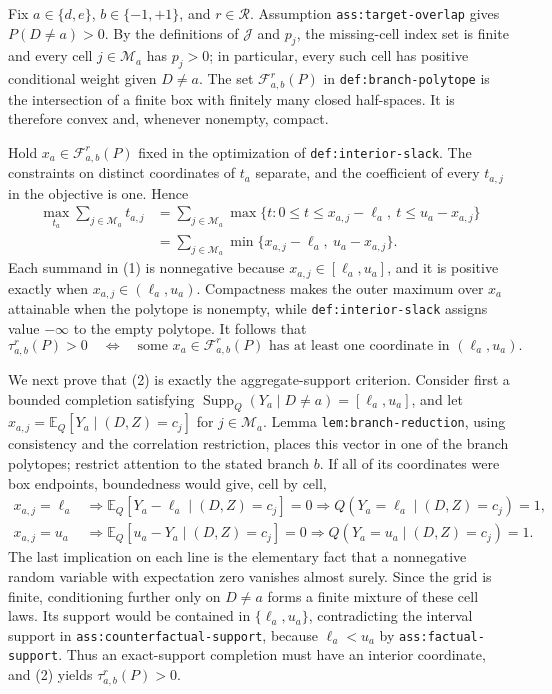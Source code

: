 Fix \(a\in\{d,e\}\), \(b\in\{-1,+1\}\), and \(r\in\mathcal R\).  Assumption \texttt{ass:target-overlap} gives \(P(D\ne a)>0\).  By the definitions of \(\mathcal J\) and \(p_j\), the missing-cell index set is finite and every cell \(j\in\mathcal M_a\) has \(p_j>0\); in particular, every such cell has positive conditional weight given \(D\ne a\).  The set \(\mathcal F_{a,b}^r(P)\) in \texttt{def:branch-polytope} is the intersection of a finite box with finitely many closed half-spaces.  It is therefore convex and, whenever nonempty, compact.

Hold \(x_a\in\mathcal F_{a,b}^r(P)\) fixed in the optimization of \texttt{def:interior-slack}.  The constraints on distinct coordinates of \(t_a\) separate, and the coefficient of every \(t_{a,j}\) in the objective is one.  Hence
\[
\begin{aligned}
\max_{t_a}\sum_{j\in\mathcal M_a}t_{a,j}
&=\sum_{j\in\mathcal M_a}
  \max\{t:0\le t\le x_{a,j}-\ell_a,\ t\le u_a-x_{a,j}\} \\
&=\sum_{j\in\mathcal M_a}
  \min\{x_{a,j}-\ell_a,\ u_a-x_{a,j}\}.
\end{aligned}
\tag{1}
\]
Each summand in (1) is nonnegative because \(x_{a,j}\in[\ell_a,u_a]\), and it is positive exactly when \(x_{a,j}\in(\ell_a,u_a)\).  Compactness makes the outer maximum over \(x_a\) attainable when the polytope is nonempty, while \texttt{def:interior-slack} assigns value \(-\infty\) to the empty polytope.  It follows that
\[
\tau_{a,b}^r(P)>0
\quad\Longleftrightarrow\quad
\text{some }x_a\in\mathcal F_{a,b}^r(P)
\text{ has at least one coordinate in }(\ell_a,u_a).
\tag{2}
\]

We next prove that (2) is exactly the aggregate-support criterion.  Consider first a bounded completion satisfying
\(\operatorname{Supp}_Q(Y_a\mid D\ne a)=[\ell_a,u_a]\), and let
\(x_{a,j}=\mathbb E_Q[Y_a\mid(D,Z)=c_j]\) for \(j\in\mathcal M_a\).  Lemma \texttt{lem:branch-reduction}, using consistency and the correlation restriction, places this vector in one of the branch polytopes; restrict attention to the stated branch \(b\).  If all of its coordinates were box endpoints, boundedness would give, cell by cell,
\[
\begin{aligned}
x_{a,j}=\ell_a
&\Longrightarrow
\mathbb E_Q[Y_a-\ell_a\mid(D,Z)=c_j]=0
\Longrightarrow Q(Y_a=\ell_a\mid(D,Z)=c_j)=1, \\
x_{a,j}=u_a
&\Longrightarrow
\mathbb E_Q[u_a-Y_a\mid(D,Z)=c_j]=0
\Longrightarrow Q(Y_a=u_a\mid(D,Z)=c_j)=1.
\end{aligned}
\tag{3}
\]
The last implication on each line is the elementary fact that a nonnegative random variable with expectation zero vanishes almost surely.  Since the grid is finite, conditioning further only on \(D\ne a\) forms a finite mixture of these cell laws.  Its support would be contained in \(\{\ell_a,u_a\}\), contradicting the interval support in \texttt{ass:counterfactual-support}, because \(\ell_a<u_a\) by \texttt{ass:factual-support}.  Thus an exact-support completion must have an interior coordinate, and (2) yields \(\tau_{a,b}^r(P)>0\).

